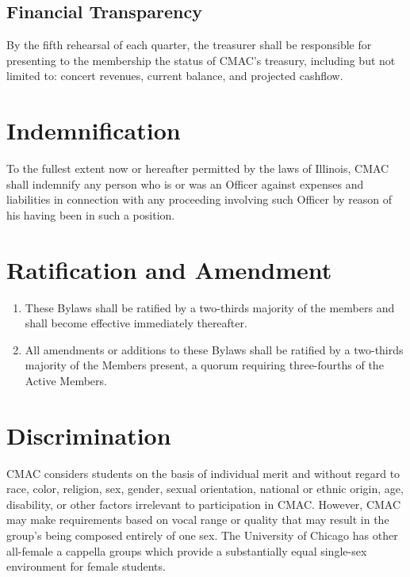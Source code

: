 \documentclass{article}
\begin{document}
\subsection{Financial Transparency}

By the fifth rehearsal of each quarter, the treasurer shall be responsible
for presenting to the membership the status of CMAC's treasury, including
but not limited to: concert revenues, current balance, and projected
cashflow.

\section{Indemnification}

To the fullest extent now or hereafter permitted by the laws of Illinois,
CMAC shall indemnify any person who is or was an Officer against expenses
and liabilities in connection with any proceeding involving such Officer
by reason of his having been in such a position.

\section{Ratification and Amendment}
\begin{enumerate}
\item These Bylaws shall be ratified by a two-thirds majority of the members
and shall become effective immediately thereafter.
\item All amendments or additions to these Bylaws shall be ratified by a
two-thirds majority of the Members present, a quorum requiring three-fourths
of the Active Members.
\end{enumerate}

\section{Discrimination}

CMAC considers students on the basis of individual
merit and without regard to race, color, religion, sex, gender, sexual
orientation, national or ethnic origin, age, disability, or other
factors irrelevant to participation in CMAC. However,
CMAC may make requirements based on vocal range or quality that may
result in the group's being composed entirely of one
sex. The University of Chicago has other all-female a cappella groups
which provide a substantially equal single-sex environment for female
students.
\end{document}
